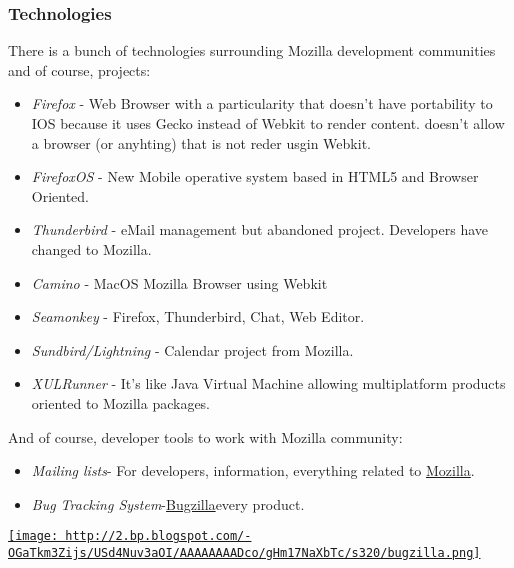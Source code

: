 \subsubsection{ Technologies} There is a bunch of technologies surrounding Mozilla development communities and of course, projects:
\\
\begin{itemize}
	\item \textit{Firefox} - Web Browser with a particularity that doesn't have portability to IOS because it uses Gecko instead of Webkit to render content. \nolinebreakApple doesn't allow a browser (or anyhting) that is not reder usgin Webkit.
	\item \textit{FirefoxOS} - New Mobile operative system based in HTML5 and Browser Oriented.
	\item \textit{Thunderbird} - eMail management but abandoned project. Developers have changed to Mozilla.
	\item \textit{Camino} - MacOS Mozilla Browser using Webkit
	\item \textit{Seamonkey} - Firefox, Thunderbird, Chat, Web Editor.
	\item \textit{Sundbird/Lightning} - Calendar project from Mozilla.
	\item \textit{XULRunner} - It's like Java Virtual Machine allowing multiplatform products oriented to Mozilla packages.
\end{itemize} And of course, developer tools to work with Mozilla community:
\begin{itemize}
	\item \textit{Mailing lists}\nolinebreak- For developers, information, everything related to \href{https://lists.mozilla.org/listinfo}{Mozilla}.
	\item \textit{Bug Tracking System}\nolinebreak-\nolinebreak\href{https://bugzilla.mozilla.org/}{Bugzilla}\nolinebreakfor every product.
\end{itemize}\href{http://2.bp.blogspot.com/-OGaTkm3Zijs/USd4Nuv3aOI/AAAAAAAADco/gHm17NaXbTc/s1600/bugzilla.png}{
\texttt{[image: http://2.bp.blogspot.com/-OGaTkm3Zijs/USd4Nuv3aOI/AAAAAAAADco/gHm17NaXbTc/s320/bugzilla.png]}}
\\
